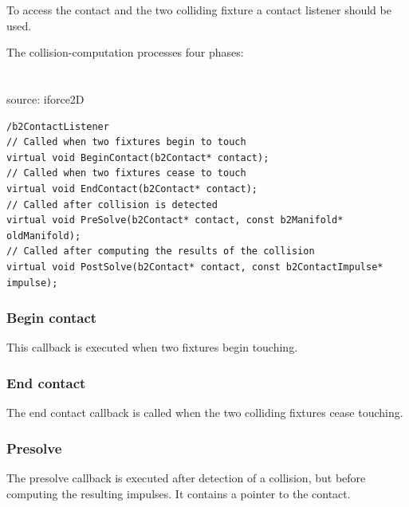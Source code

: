 \documentclass[10pt,a4paper,DIV=11]{scrreprt}
\begin{document}
To access the contact and the two colliding fixture a contact listener should be used.

The collision-computation processes four phases: \\

   \\
\\


source: iforce2D


\begin{lstlisting}[caption={Contact listener methods},label=lst:collision-contact]
/b2ContactListener
// Called when two fixtures begin to touch
virtual void BeginContact(b2Contact* contact);
// Called when two fixtures cease to touch
virtual void EndContact(b2Contact* contact);
// Called after collision is detected
virtual void PreSolve(b2Contact* contact, const b2Manifold* oldManifold);
// Called after computing the results of the collision
virtual void PostSolve(b2Contact* contact, const b2ContactImpulse* impulse);
\end{lstlisting}

\subsubsection*{Begin contact}
This callback is executed when two fixtures begin touching.

\subsubsection*{End contact}
The end contact callback is called when the two colliding fixtures cease touching.

\subsubsection*{Presolve}
The presolve callback is executed after detection of a collision, but before computing the resulting impulses. It contains a pointer to the contact.
\end{document}
